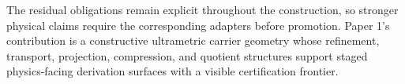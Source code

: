 \documentclass[11pt]{article}
\theoremstyle{definition}
\theoremstyle{plain}
\theoremstyle{remark}
\begin{document}
The residual obligations remain explicit throughout the construction, so
stronger physical claims require the corresponding adapters before promotion.
Paper 1's contribution is a constructive ultrametric carrier geometry whose
refinement, transport, projection, compression, and quotient structures support
staged physics-facing derivation surfaces with a visible certification
frontier.

\nocite{cms-smp-20-003,hepdata-ins2079374,collins-soper-sterman-1985,ebert-michel-stewart-tackmann-2021,drell-yan-1970,agda-stdlib,wellen-cartan-modal-hott-2018}


\end{document}
